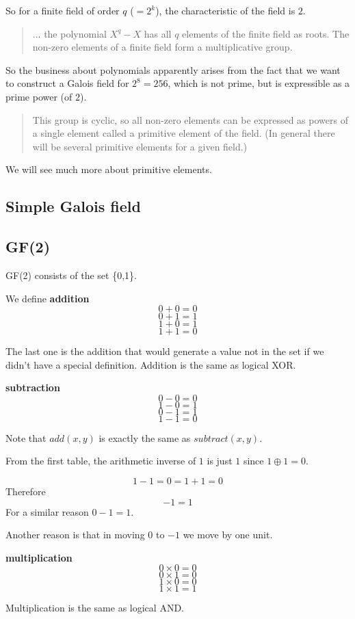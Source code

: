 \documentclass[11pt, oneside]{article}
\begin{document}
So for a finite field of order $q$ ($= 2^k$), the characteristic of the field is $2$.

\begin{quote}... the polynomial $X^q-X$ has all $q$ elements of the finite field as roots. The non-zero elements of a finite field form a multiplicative group.\end{quote}

So the business about polynomials apparently arises from the fact that we want to construct a Galois field for $2^8 = 256$, which is not prime, but is expressible as a prime power (of $2$).

\begin{quote}This group is cyclic, so all non-zero elements can be expressed as powers of a single element called a primitive element of the field. (In general there will be several primitive elements for a given field.)
\end{quote}

We will see much more about primitive elements.

\subsection*{Simple Galois field}

\subsection*{GF(2)}

GF(2) consists of the set \{0,1\}.

We define \textbf{addition}
\[ 0 + 0 = 0 \]
\[ 0 + 1 = 1 \]
\[ 1 + 0 = 1 \]
\[ 1 + 1 = 0 \]

The last one is the addition that would generate a value not in the set if we didn't have a special definition.  Addition is the same as logical XOR.

\textbf{subtraction}
\[ 0 - 0 = 0 \]
\[ 1 - 0 = 1 \] 
\[ 0 - 1 = 1 \]
\[ 1 - 1 = 0 \]

Note that $add(x,y)$ is exactly the same as $subtract(x,y)$.

From the first table, the arithmetic inverse of $1$ is just $1$ since $1 \oplus 1 = 0$.

\[ 1 - 1 = 0 = 1 + 1 = 0 \]
Therefore
\[ -1 = 1 \]
For a similar reason $0 - 1 = 1$.

Another reason is that in moving  $0$ to $-1$ we move by one unit.

\textbf{multiplication}
\[ 0 \times 0 = 0 \]
\[ 0 \times 1 = 0 \]
\[ 1 \times 0 = 0 \]
\[ 1 \times 1 = 1 \]

Multiplication is the same as logical AND.
\end{document}
